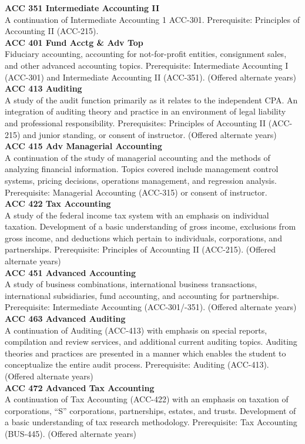 \documentclass[
  letterpaper,
]{scrbook}
\begin{document}
\textbf{ACC 351 Intermediate Accounting II}\\
A continuation of Intermediate Accounting 1 ACC-301. Prerequisite:
Principles of Accounting II (ACC-215).\\
\textbf{ACC 401 Fund Acctg \& Adv Top}\\
Fiduciary accounting, accounting for not-for-profit entities,
consignment sales, and other advanced accounting topics. Prerequisite:
Intermediate Accounting I (ACC-301) and Intermediate Accounting II
(ACC-351). (Offered alternate years)\\
\textbf{ACC 413 Auditing}\\
A study of the audit function primarily as it relates to the independent
CPA. An integration of auditing theory and practice in an environment of
legal liability and professional responsibility. Prerequisites:
Principles of Accounting II (ACC-215) and junior standing, or consent of
instructor. (Offered alternate years)\\
\textbf{ACC 415 Adv Managerial Accounting}\\
A continuation of the study of managerial accounting and the methods of
analyzing financial information. Topics covered include management
control systems, pricing decisions, operations management, and
regression analysis. Prerequisite: Managerial Accounting (ACC-315) or
consent of instructor.\\
\textbf{ACC 422 Tax Accounting}\\
A study of the federal income tax system with an emphasis on individual
taxation. Development of a basic understanding of gross income,
exclusions from gross income, and deductions which pertain to
individuals, corporations, and partnerships. Prerequisite: Principles of
Accounting II (ACC-215). (Offered alternate years)\\
\textbf{ACC 451 Advanced Accounting}\\
A study of business combinations, international business transactions,
international subsidiaries, fund accounting, and accounting for
partnerships. Prerequisite: Intermediate Accounting (ACC-301/-351).
(Offered alternate years)\\
\textbf{ACC 463 Advanced Auditing}\\
A continuation of Auditing (ACC-413) with emphasis on special reports,
compilation and review services, and additional current auditing topics.
Auditing theories and practices are presented in a manner which enables
the student to conceptualize the entire audit process. Prerequisite:
Auditing (ACC-413). (Offered alternate years)\\
\textbf{ACC 472 Advanced Tax Accounting}\\
A continuation of Tax Accounting (ACC-422) with an emphasis on taxation
of corporations, ``S'' corporations, partnerships, estates, and trusts.
Development of a basic understanding of tax research methodology.
Prerequisite: Tax Accounting (BUS-445). (Offered alternate years)
\end{document}
